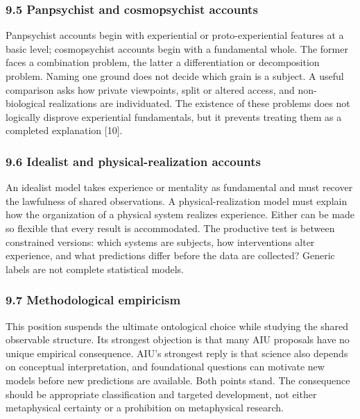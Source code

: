 \documentclass[
  10pt,
  a4paper,
]{article}
\begin{document}
\subsubsection{9.5 Panpsychist and cosmopsychist
accounts}\label{panpsychist-and-cosmopsychist-accounts}

Panpsychist accounts begin with experiential or proto-experiential
features at a basic level; cosmopsychist accounts begin with a
fundamental whole. The former faces a combination problem, the latter a
differentiation or decomposition problem. Naming one ground does not
decide which grain is a subject. A useful comparison asks how private
viewpoints, split or altered access, and non-biological realizations are
individuated. The existence of these problems does not logically
disprove experiential fundamentals, but it prevents treating them as a
completed explanation {[}10{]}.

\subsubsection{9.6 Idealist and physical-realization
accounts}\label{idealist-and-physical-realization-accounts}

An idealist model takes experience or mentality as fundamental and must
recover the lawfulness of shared observations. A physical-realization
model must explain how the organization of a physical system realizes
experience. Either can be made so flexible that every result is
accommodated. The productive test is between constrained versions: which
systems are subjects, how interventions alter experience, and what
predictions differ before the data are collected? Generic labels are not
complete statistical models.

\subsubsection{9.7 Methodological
empiricism}\label{methodological-empiricism}

This position suspends the ultimate ontological choice while studying
the shared observable structure. Its strongest objection is that many
AIU proposals have no unique empirical consequence. AIU's strongest
reply is that science also depends on conceptual interpretation, and
foundational questions can motivate new models before new predictions
are available. Both points stand. The consequence should be appropriate
classification and targeted development, not either metaphysical
certainty or a prohibition on metaphysical research.
\end{document}
